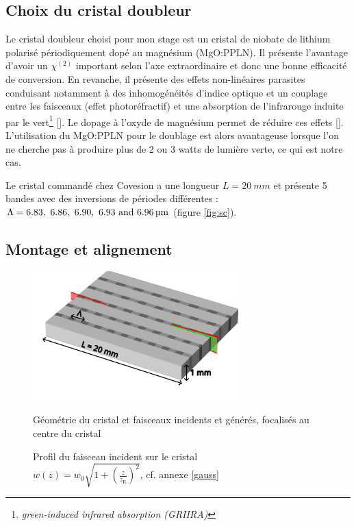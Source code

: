 \documentclass[11pt,a4paper]{article}
\newcommand{\ncite}[1]{[\citenum{#1}]}
\edef\hc{\string:}\newcommand{\dv}[2]{\frac{\mathrm d #1}{\mathrm d #2}}
\newcommand{\zr}{z_\mathsc{R}}
\newcommand{\mathsc}[1]{\mathrm{\scriptscriptstyle {#1}}}
\begin{document}
\subsection{Choix du cristal doubleur}

Le cristal doubleur choisi pour mon stage est un cristal de niobate de lithium polarisé périodiquement dopé au magnésium (MgO\hc PPLN). Il présente l'avantage d'avoir un $\chi^{(2)}$ important selon l'axe extraordinaire et donc une bonne efficacité de conversion. En revanche, il présente des effets non-linéaires parasites conduisant notamment à des inhomogénéités d'indice optique et un couplage entre les faisceaux (effet photoréfractif) et une absorption de l'infrarouge induite par le vert\footnote{\textit{green-induced infrared absorption (GRIIRA)}} \ncite{batchko}. Le dopage à l'oxyde de magnésium permet de réduire ces effets \ncite{furukawa}. L'utilisation du MgO\hc PPLN pour le doublage est alors avantageuse lorsque l'on ne cherche pas à produire plus de 2 ou 3 watts de lumière verte, ce qui est notre cas. %

Le cristal commandé chez Covesion a une longueur $L=\SI{20}{mm}$ et présente 5 bandes avec des inversions de périodes différentes : $\Lambda = \qtylist[list-units = single]{6.83; 6.86 ; 6.90 ; 6.93 ; 6,96}{\micro\meter}$ (figure \ref{fig:sc}).

\subsection{Montage et alignement}  



\begin{figure}[htpb]
\centering
\hspace*{-0.8cm}
\begin{minipage}[t]{0.48\textwidth}
	\centering
	\vspace{0.75cm}
	\includegraphics[height=5cm]{./img/cristal2.pdf}
	\vspace{0.85cm}
	\caption{Géométrie du cristal et faisceaux incidents et générés, focalisés au centre du cristal}
	\label{fig:sc}
\end{minipage}
\centering
\hspace*{0.4cm}
\begin{minipage}[t]{0.48\textwidth}
    
		\vspace{-1cm}
    \caption[Profil du faisceau incident sur le cristal]{Profil du faisceau incident sur le cristal \\ \small $w(z) = w_0 \sqrt{1+\left(\frac{z}{\zr}\right)^2}$, cf. annexe \ref{gauss}}
    \label{fig:wincident}
\end{minipage}
\end{figure}
\end{document}
